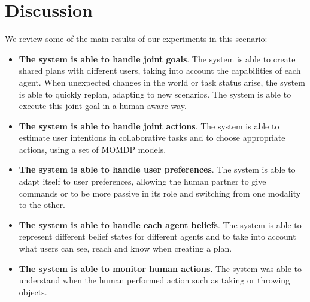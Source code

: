 \section{Discussion}
\label{sec:coworker_experiments-discussion}
We review some of the main results of our experiments in this scenario:
\begin{itemize}

\item
\textbf{The system is able to handle joint goals}.
The system is able to create shared plans with different users, taking
into account the capabilities of each agent. When unexpected changes
in the world or task status arise, the system is able to quickly
replan, adapting to new scenarios. The system is able to execute this
joint goal in a human aware way. 
                                
\item
\textbf{The system is able to handle joint actions}.
The system is able to estimate user intentions in collaborative tasks and to choose appropriate actions, using a set of MOMDP models.

\item
\textbf{The system is able to handle user preferences}.
The system is able to adapt itself to user preferences, allowing the
human partner to give commands or to be more passive in its role and
switching from one modality to the other. 
\item
\textbf{The system is able to handle each agent beliefs}.
The system is able to represent different belief states for different agents and to take into account what users can see, reach and know when creating a plan.

\item
\textbf{The system is able to monitor human actions}.
The system was able to understand when the human performed action such as taking or throwing objects.
\end{itemize}

